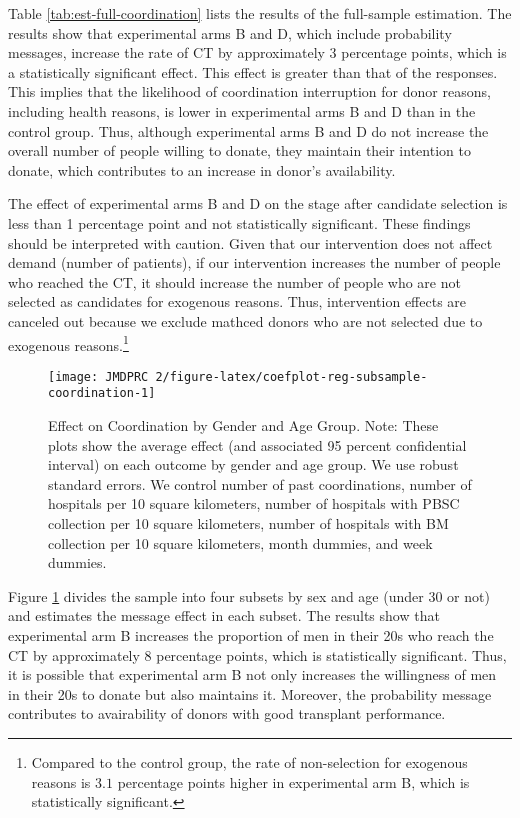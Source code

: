 \documentclass[12pt, a4paper]{article}
\begin{document}
Table \ref{tab:est-full-coordination} lists the results of the full-sample estimation. The results show that experimental arms B and D, which include probability messages, increase the rate of CT by approximately 3 percentage points, which is a statistically significant effect. This effect is greater than that of the responses. This implies that the likelihood of coordination interruption for donor reasons, including health reasons, is lower in experimental arms B and D than in the control group. Thus, although experimental arms B and D do not increase the overall number of people willing to donate, they maintain their intention to donate, which contributes to an increase in donor's availability.

The effect of experimental arms B and D on the stage after candidate selection is less than 1 percentage point and not statistically significant. These findings should be interpreted with caution. Given that our intervention does not affect demand (number of patients), if our intervention increases the number of people who reached the CT, it should increase the number of people who are not selected as candidates for exogenous reasons. Thus, intervention effects are canceled out because we exclude mathced donors who are not selected due to exogenous reasons.\footnote{Compared to the control group, the rate of non-selection for exogenous reasons is \(3.1\) percentage points higher in experimental arm B, which is statistically significant.}

\begin{figure}[t]
\texttt{[image: JMDPRC~2/figure-latex/coefplot-reg-subsample-coordination-1]} \caption{Effect on Coordination by Gender and Age Group. Note: These plots show the average effect (and associated 95 percent confidential interval) on each outcome by gender and age group. We use robust standard errors. We control number of past coordinations, number of hospitals per 10 square kilometers, number of hospitals with PBSC collection per 10 square kilometers, number of hospitals with BM collection per 10 square kilometers, month dummies, and week dummies.}\label{fig:coefplot-reg-subsample-coordination}
\end{figure}

Figure \ref{fig:coefplot-reg-subsample-coordination} divides the sample into four subsets by sex and age (under 30 or not) and estimates the message effect in each subset. The results show that experimental arm B increases the proportion of men in their 20s who reach the CT by approximately 8 percentage points, which is statistically significant. Thus, it is possible that experimental arm B not only increases the willingness of men in their 20s to donate but also maintains it. Moreover, the probability message contributes to avairability of donors with good transplant performance.
\end{document}
